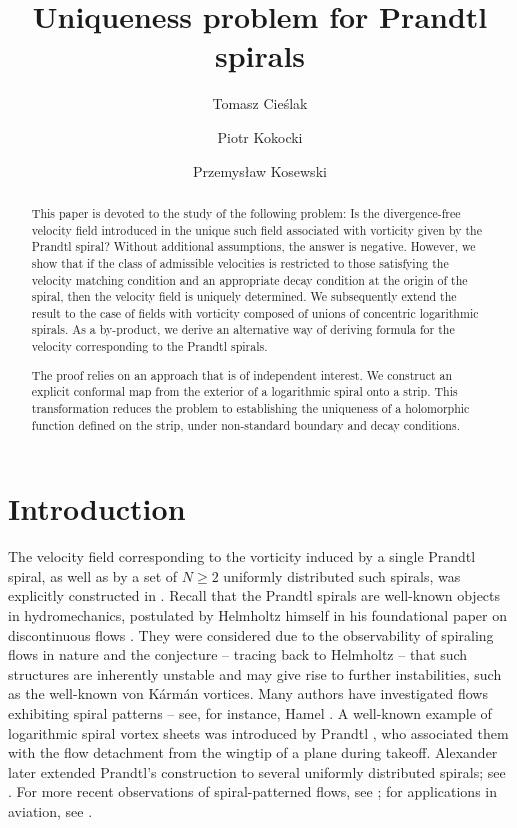 \documentclass[11pt, letterpaper, reqno]{amsart}
\author{Tomasz Cie\'{s}lak}
\author{Piotr Kokocki}
\author{Przemys\l{}aw Kosewski}
\title[Uniqueness problem for Prandtl spirals]{Uniqueness problem for Prandtl spirals}
\numberwithin{equation}{section}
\theoremstyle{definition}
\theoremstyle{plain}
\numberwithin{equation}{section}
\begin{document}
\begin{abstract}
This paper is devoted to the study of the following problem: Is the divergence-free velocity field introduced in \cite{CKO} the unique such field associated with vorticity given by the Prandtl spiral? Without additional assumptions, the answer is negative. However, we show that if the class of admissible velocities is restricted to those satisfying the velocity matching condition and an appropriate decay condition at the origin of the spiral, then the velocity field is uniquely determined. We subsequently extend the result to the case of fields with vorticity composed of unions of concentric logarithmic spirals. As a by-product, we derive an alternative way of deriving formula for the velocity corresponding to the Prandtl spirals.

The proof relies on an approach that is of independent interest. We construct an explicit conformal map from the exterior of a logarithmic spiral onto a strip. This transformation reduces the problem to establishing the uniqueness of a holomorphic function defined on the strip, under non-standard boundary and decay conditions.
\end{abstract}





\maketitle


\section{Introduction}
The velocity field corresponding to the vorticity induced by a single Prandtl spiral, as well as by a set of $N\geq 2$ uniformly distributed such spirals, was explicitly constructed in \cite{CKO}. Recall that the Prandtl spirals are well-known objects in hydromechanics, postulated by Helmholtz himself in his foundational paper on discontinuous flows \cite{Helmholtz}. They were considered due to the observability of spiraling flows in nature and the conjecture -- tracing back to Helmholtz -- that such structures are inherently unstable and may give rise to further instabilities, such as the well-known von K\'arm\'an vortices. Many authors have investigated flows exhibiting spiral patterns -- see, for instance, Hamel \cite{Hamel}. A well-known example of logarithmic spiral vortex sheets was introduced by Prandtl \cite{Prandtl}, who associated them with the flow detachment from the wingtip of a plane during takeoff. Alexander later extended Prandtl’s construction to several uniformly distributed spirals; see \cite{alexander}. For more recent observations of spiral-patterned flows, see \cite{Everson}; for applications in aviation, see \cite{saffman}.
\end{document}
